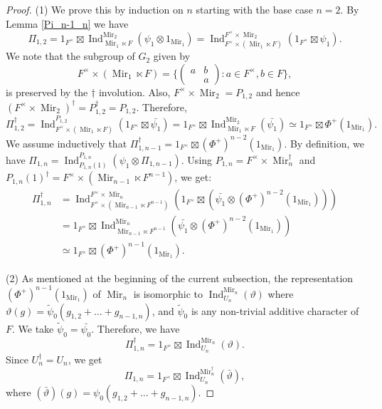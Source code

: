 \documentclass[reqno]{amsart}
\theoremstyle{definition}
\theoremstyle{remark}
\numberwithin{equation}{section}
\DeclareMathOperator{\Ind}{Ind}
\DeclareMathOperator{\Mir}{Mir}
\newcommand{\bbsm}{\left (\begin{smallmatrix}}      \newcommand{\besm}{\end{smallmatrix}\right )}
\begin{document}
\begin{proof}
    (1) We prove this by induction on $n$ starting with the base case $n=2$. By Lemma \ref{Pi_n-1_n} we have
    \[ \Pi_{1,2} = 1_{F^\times} \boxtimes \Ind_{\Mir_1 \ltimes F}^{\Mir_2} (\psi_1 \otimes 1_{\Mir_1}) = \Ind_{F^\times \times (\Mir_1 \ltimes F)}^{F^\times \times  \Mir_2} (1_{F^\times} \boxtimes \psi_1).\] We note that the subgroup of $G_2$ given by  \[ F^\times \times (\Mir_1 \ltimes F) = \{\bbsm a & b\\&a \besm  \colon a \in F^\times, b \in F\},\]  is preserved by the $\dagger$ involution. Also, $F^\times \times \Mir_2 = P_{1,2}$ and hence $(F^\times \times \Mir_2)^\dagger = P_{1,2}^\dagger = P_{1,2}$. Therefore,
    \[ 
        \Pi_{1,2}^\dagger = \Ind_{F^\times \times (\Mir_1 \ltimes F)}^{P_{1,2}} (1_{F^\times} \boxtimes \bar{\psi_1}) =1_{F^\times} \boxtimes \Ind_{\Mir_1 \ltimes F}^{\Mir_2} (\bar{\psi_1}) \simeq 1_{F^\times} \boxtimes \Phi^+(1_{\Mir_1}).
    \]
    We assume inductively that $\Pi_{1,n-1}^\dagger= 1_{F^\times} \boxtimes (\Phi^+)^{n-2}(1_{\Mir_1})$. By definition, we have   $ \Pi_{1,n} = \Ind_{P_{1,n}(1)}^{P_{1,n}} (\psi_1 \otimes \Pi_{1,n-1})$. Using  
     $P_{1,n}=F^\times \times \Mir_n^\dagger$ and $P_{1,n}(1)^\dagger=F^\times \times (\Mir_{n-1} \ltimes F^{n-1} )$, we get:
     \begin{align*} \Pi_{1,n}^\dagger &=  \Ind_{F^\times \times (\Mir_{n-1} \ltimes F^{n-1} )}^{F^\times \times \Mir_n}(1_{F^\times} \boxtimes (\bar{\psi_1} \otimes (\Phi^+)^{n-2}(1_{\Mir_1}) ))\\&=1_{F^\times} \boxtimes \Ind_{\Mir_{n-1} \ltimes F^{n-1} }^{\Mir_n} (\bar{\psi_1} \otimes (\Phi^+)^{n-2}(1_{\Mir_1})) \\
     &\simeq  1_{F^\times} \boxtimes (\Phi^+)^{n-1}(1_{\Mir_1}).
     \end{align*}
    
    (2) As mentioned at the beginning of the current subsection,  the representation $(\Phi^+)^{n-1}(1_{\Mir_1})$ of $\Mir_n$ is isomorphic to  $\Ind_{U_n}^{\Mir_n}(\vartheta)$ where $\vartheta(g) = \tilde\psi_0(g_{1,2}+ \dots+g_{n-1,n})$, and  $\tilde\psi_0$ is any non-trivial additive character  of $F$. We take $\tilde\psi_0=\bar{\psi_0}$. Therefore, we have 
    \[\Pi_{1,n}^\dagger= 1_{F^\times} \boxtimes \Ind_{U_n}^{\Mir_n}(\vartheta).\]
    Since $U_n^\dagger=U_n$, we get
\[\Pi_{1,n}= 1_{F^\times} \boxtimes \Ind_{U_n}^{\Mir_n^\dagger }(\bar{\vartheta}),\]
    where $(\bar \vartheta)(g) = \psi_0(g_{1,2}+ \dots+g_{n-1,n})$.
    \end{proof}
\end{document}

